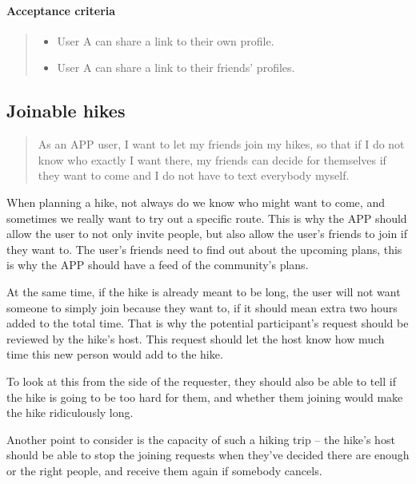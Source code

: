 \paragraph*{Acceptance criteria}
\begin{quote}
    \begin{itemize}
        \item User A can share a link to their own profile.
        \item User A can share a link to their friends' profiles.
    \end{itemize}
\end{quote}


\subsection{Joinable hikes}\label{US:friends-join-hikes}
\begin{quote}
As an APP user, I want to let my friends join my hikes, so that if I do not know who exactly I want there, my friends can decide for themselves if they want to come and I do not have to text everybody myself.
\end{quote}

When planning a hike, not always do we know who might want to come, and sometimes we really want to try out a specific route.
This is why the APP should allow the user to not only invite people, but also allow the user's friends to join if they want to.
The user's friends need to find out about the upcoming plans, this is why the APP should have a feed of the community's plans.

At the same time, if the hike is already meant to be long, the user will not want someone to simply join because they want to, if it should mean extra two hours added to the total time.
That is why the potential participant's request should be reviewed by the hike's host.
This request should let the host know how much time this new person would add to the hike.

To look at this from the side of the requester, they should also be able to tell if the hike is going to be too hard for them, and whether them joining would make the hike ridiculously long.

Another point to consider is the capacity of such a hiking trip -- the hike's host should be able to stop the joining requests when they've decided there are enough or the right people, and receive them again if somebody cancels.

